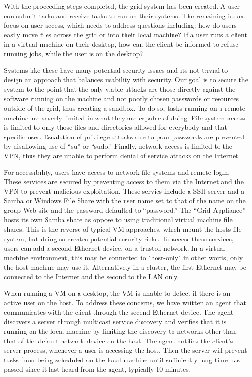 \documentclass[conference]{IEEEtran}
\begin{document}
With the proceeding steps completed, the grid system has been created.  A user
can submit tasks and receive tasks to run on their systems.  The remaining
issues focus on user access, which needs to address questions including: how do
users easily move files across the grid or into their local machine?  If a user
runs a client in a virtual machine on their desktop, how can the client be
informed to refuse running jobs, while the user is on the desktop?

Systems like these have many potential security issues and its not trivial to
design an approach that balances usability with security.  Our goal is to
secure the system to the point that the only viable attacks are those directly
against the software running on the machine and not poorly chosen passwords or
resources outside of the grid, thus creating a sandbox.  To do so, tasks
running on a remote machine are severly limited in what they are capable of
doing.  File system access is limited to only those files and directories
allowed for everybody and that specific user.  Escalation of privilege attacks
due to poor passwords are prevented by disallowing use of ``su'' or ``sudo.''
Finally, network access is limited to the VPN, thus they are unable to perform
denial of service attacks on the Internet.

For accessibility, users have access to network file systems and remote login.
These services are secured by preventing access to them via the Internet and
the VPN to prevent malicious exploitation.  These servies include a SSH server
and a Samba or Windows File Share with the user name set to that of the name on
the group Web site and the password defaulted to ``password.'' The ``Grid
Appliance'' hosts its own Samba share as oppose to using traditional virtual
machine file shares.  This is the reverse of typical VM approaches, which mount
the hosts file system, but doing so creates potential security risks.  To
access these services, users can add a second Ethernet device, on a trusted
network.  In a virtual machine environment, this may be connected to
"host-only" in other words, only the host machine may use it.  Alternatively in
a cluster, the first Ethernet may be connected to the Internet and the second
to the LAN only.

When running a VM on a desktop, the VM is unable to detect if there is an
active user on the host.  To address these concerns, we have written an agent
that communicates with the client through the second Ethernet device.  The
agent discovers a server through multicast service discovery and verifies that
it is running on the local machine by limiting the discovery to networks other
than that of the default network device on the host.  The agent notifies the
client's server process, whenever a user is accessing the host.  Then the
server will prevent tasks from being scheduled on the local machine until
sufficiently long time has passed since it last heard from the agent, typically
10 minutes.
\end{document}
